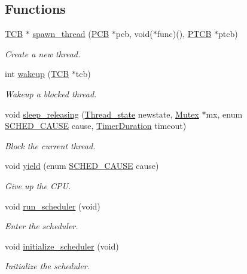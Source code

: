 \subsection*{Functions}
\begin{DoxyCompactItemize}
\item 
\hyperlink{group__scheduler_gaf88d9c946bf70b36a1e8bc34383abfc9}{T\+CB} $\ast$ \hyperlink{group__scheduler_gab0a2dca5105d7e856f03c0cc4dc4d707}{spawn\+\_\+thread} (\hyperlink{group__proc_ga91aaadf0c3f9cef2293a99c69795323f}{P\+CB} $\ast$pcb, void($\ast$func)(), \hyperlink{structprocess__thread__control__block}{P\+T\+CB} $\ast$ptcb)
\begin{DoxyCompactList}\small\item\em Create a new thread. \end{DoxyCompactList}\item 
int \hyperlink{group__scheduler_gae8301452fd9ae5bf7cd7f2676650ff06}{wakeup} (\hyperlink{group__scheduler_gaf88d9c946bf70b36a1e8bc34383abfc9}{T\+CB} $\ast$tcb)
\begin{DoxyCompactList}\small\item\em Wakeup a blocked thread. \end{DoxyCompactList}\item 
void \hyperlink{group__scheduler_ga0ab1a2dcfbfe3fb09cc24044efddfd34}{sleep\+\_\+releasing} (\hyperlink{group__scheduler_ga6c969c169777f82c104cf73e501df70f}{Thread\+\_\+state} newstate, \hyperlink{group__syscalls_gaef2ec62cae8e0031fd19fc8b91083ade}{Mutex} $\ast$mx, enum \hyperlink{group__scheduler_gaad787d8d80312ffca3c0f197b3a25fbe}{S\+C\+H\+E\+D\+\_\+\+C\+A\+U\+SE} cause, \hyperlink{bios_8h_ae7291e5cd742fb9bc6d4aaa0d51bd0ee}{Timer\+Duration} timeout)
\begin{DoxyCompactList}\small\item\em Block the current thread. \end{DoxyCompactList}\item 
void \hyperlink{group__scheduler_ga1db327892199949812ae5a52119f2e97}{yield} (enum \hyperlink{group__scheduler_gaad787d8d80312ffca3c0f197b3a25fbe}{S\+C\+H\+E\+D\+\_\+\+C\+A\+U\+SE} cause)
\begin{DoxyCompactList}\small\item\em Give up the C\+PU. \end{DoxyCompactList}\item 
void \hyperlink{group__scheduler_ga147600b59d656eb9d9558673c2fad36d}{run\+\_\+scheduler} (void)
\begin{DoxyCompactList}\small\item\em Enter the scheduler. \end{DoxyCompactList}\item 
void \hyperlink{group__scheduler_ga244fb594301322e79d11a7844c759bba}{initialize\+\_\+scheduler} (void)
\begin{DoxyCompactList}\small\item\em Initialize the scheduler. \end{DoxyCompactList}\end{DoxyCompactItemize}
